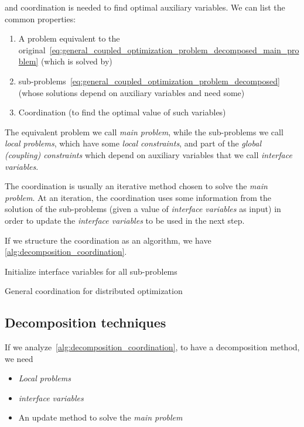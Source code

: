\documentclass[../main.tex]{subfiles}
\begin{document}
and coordination is needed to find optimal auxiliary variables.
We can list the common properties:
\begin{enumerate}
  \item A problem equivalent to the original~\eqref{eq:general_coupled_optimization_problem_decomposed_main_problem} (which is solved by)
  \item sub-problems~\eqref{eq:general_coupled_optimization_problem_decomposed} (whose solutions depend on auxiliary variables and need some)
  \item Coordination (to find the optimal value of such variables)
\end{enumerate}

The equivalent problem we call \emph{main problem}, while the sub-problems we call \emph{local problems}, which have some \emph{local constraints}, and part of the \emph{global (coupling) constraints} which depend on auxiliary variables that we call \emph{interface variables}.

The coordination is usually an iterative method chosen to solve the \emph{main problem}.
At an iteration, the coordination uses some information from the solution of the sub-problems (given a value of \emph{interface variables} as input) in order to update the \emph{interface variables} to be used in the next step.

If we structure the coordination as an algorithm, we have \autoref{alg:decomposition_coordination}.

\begin{algorithm2e}[H]
  \DontPrintSemicolon%
  Initialize interface variables for all sub-problems\;
  \caption{General coordination for distributed optimization}\label{alg:decomposition_coordination}
\end{algorithm2e}

\subsection{Decomposition techniques}

If we analyze \autoref{alg:decomposition_coordination}, to have a decomposition method, we need
\begin{itemize}
  \item \emph{Local problems}
  \item \emph{interface variables}
  \item An update method to solve the \emph{main problem}
\end{itemize}
\end{document}
